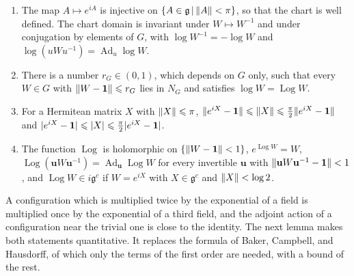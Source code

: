 \documentclass[11pt]{preprint}
\newcommand{\id}{\mathbf 1}
\newcommand{\Ad}{\operatorname{Ad}}
\DeclarePairedDelimiter{\abs}{\lvert}{\rvert}
\DeclarePairedDelimiter{\norm}{\lVert}{\rVert}
\numberwithin{equation}{section}
\begin{document}
\begin{lemma}\label{lem:chart}
\begin{enumerate}[label=(\roman*)]
\item The map $A \mapsto e^{iA}$ is injective on $\{ A \in \mathfrak g \,|\, \norm A < \pi \}$, so that the chart is well defined. The chart domain is invariant under $W \mapsto W^{-1}$ and under conjugation by elements of $G$, with $\log W^{-1} = -\log W$ and $\log(uWu^{-1}) = \Ad_u\log W$.
\item There is a number $r_G \in (0, 1)$, which depends on $G$ only, such that every $W \in G$ with $\norm{W - \id} \leqslant r_G$ lies in $N_G$ and satisfies $\log W = \operatorname{Log}W$.
\item For a Hermitean matrix $X$ with $\norm X \leqslant \pi$, $\norm{e^{iX} - \id} \leqslant \norm X \leqslant \frac{\pi}{2}\norm{e^{iX} - \id}$ and $\abs{e^{iX} - \id} \leqslant \abs X \leqslant \frac{\pi}{2}\abs{e^{iX} - \id}$.
\item The function $\operatorname{Log}$ is holomorphic on $\{ \norm{W - \id} < 1 \}$, $e^{\operatorname{Log}W} = W$, $\operatorname{Log}(\mathbf uW\mathbf u^{-1}) = \Ad_{\mathbf u}\operatorname{Log}W$ for every invertible $\mathbf u$ with $\norm{\mathbf uW\mathbf u^{-1} - \id} < 1$, and $\operatorname{Log}W \in i\mathfrak g^c$ if $W = e^{iX}$ with $X \in \mathfrak g^c$ and $\norm X < \log 2$.
\end{enumerate}
\end{lemma}

A configuration which is multiplied twice by the exponential of a field is multiplied once by the exponential of a third field, and the adjoint action of a configuration near the trivial one is close to the identity. The next lemma makes both statements quantitative. It replaces the formula of Baker, Campbell, and Hausdorff, of which only the terms of the first order are needed, with a bound of the rest.
\end{document}
